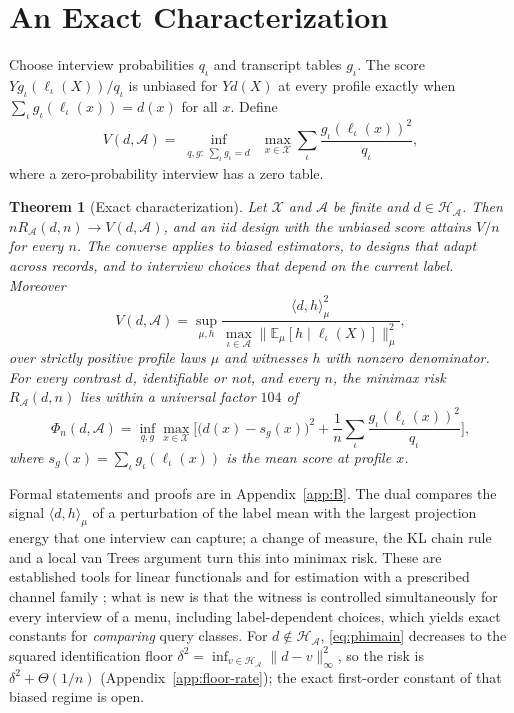\documentclass{article}
\newtheorem{theorem}{Theorem}
\newcommand{\E}{\mathbb{E}}
\newcommand{\X}{\mathcal X}
\newcommand{\A}{\mathcal A}
\newcommand{\Hh}{\mathcal H}
\begin{document}
\section{An Exact Characterization}\label{sec:general}
Choose interview probabilities $q_\iota$ and transcript tables $g_\iota$. The score $Yg_\iota(\ell_\iota(X))/q_\iota$ is unbiased for $Yd(X)$ at every profile exactly when $\sum_\iota g_\iota(\ell_\iota(x))=d(x)$ for all $x$. Define
\begin{equation}
 V(d,\A)=\inf_{\substack{q,g:\ \sum_\iota g_\iota=d}}\ \max_{x\in\X}
             \sum_\iota\frac{g_\iota(\ell_\iota(x))^2}{q_\iota},\label{eq:unbiasedprogram}
\end{equation}
where a zero-probability interview has a zero table.

\begin{theorem}[Exact characterization]\label{thm:char}
Let $\X$ and $\A$ be finite and $d\in\Hh_\A$. Then $nR_\A(d,n)\to V(d,\A)$, and an iid design with the unbiased score attains $V/n$ for every $n$. The converse applies to biased estimators, to designs that adapt across records, and to interview choices that depend on the current label. Moreover
\[
 V(d,\A)=\sup_{\mu,h}\frac{\langle d,h\rangle_\mu^2}{\max_{\iota\in\A}\|\E_\mu[h\mid\ell_\iota(X)]\|_\mu^2},
\]
over strictly positive profile laws $\mu$ and witnesses $h$ with nonzero denominator. For every contrast $d$, identifiable or not, and every $n$, the minimax risk $R_\A(d,n)$ lies within a universal factor $104$ of
\begin{equation}
 \Phi_n(d,\A)=\inf_{q,g}\max_{x\in\X}\Big[\big(d(x)-s_g(x)\big)^2+\frac1n\sum_\iota\frac{g_\iota(\ell_\iota(x))^2}{q_\iota}\Big],\!\!\label{eq:phimain}
\end{equation}
where $s_g(x)=\sum_\iota g_\iota(\ell_\iota(x))$ is the mean score at profile $x$.
\end{theorem}
Formal statements and proofs are in Appendix~\ref{app:B}. The dual compares the signal $\langle d,h\rangle_\mu$ of a perturbation of the label mean with the largest projection energy that one interview can capture; a change of measure, the KL chain rule and a local van Trees argument turn this into minimax risk. These are established tools for linear functionals \citep{donoho1994,juditsky2009,polyanskiy2026} and for estimation with a prescribed channel family \citep{acharya2019,barnes2020}; what is new is that the witness is controlled simultaneously for every interview of a menu, including label-dependent choices, which yields exact constants for \emph{comparing} query classes. For $d\notin\Hh_\A$, \eqref{eq:phimain} decreases to the squared identification floor $\delta^2=\inf_{v\in\Hh_\A}\|d-v\|_\infty^2$, so the risk is $\delta^2+\Theta(1/n)$ (Appendix~\ref{app:floor-rate}); the exact first-order constant of that biased regime is open.
\end{document}
